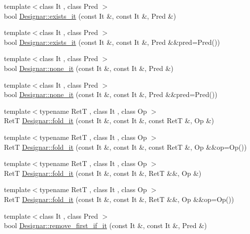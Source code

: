 \begin{DoxyCompactItemize}
{\footnotesize template$<$class It , class Pred $>$ }\\bool \hyperlink{namespace_designar_a65348ae854999f031477dcc97f6a4865}{Designar\+::exists\+\_\+it} (const It \&, const It \&, Pred \&)
\item 
{\footnotesize template$<$class It , class Pred $>$ }\\bool \hyperlink{namespace_designar_abac7b042ab21f3b7e1359cbec17b5e96}{Designar\+::exists\+\_\+it} (const It \&, const It \&, Pred \&\&pred=Pred())
\item 
{\footnotesize template$<$class It , class Pred $>$ }\\bool \hyperlink{namespace_designar_a1f6b851accb92e3589c88a4c75061588}{Designar\+::none\+\_\+it} (const It \&, const It \&, Pred \&)
\item 
{\footnotesize template$<$class It , class Pred $>$ }\\bool \hyperlink{namespace_designar_a1db95e69891b9a861d56297c556a645b}{Designar\+::none\+\_\+it} (const It \&, const It \&, Pred \&\&pred=Pred())
\item 
{\footnotesize template$<$typename RetT , class It , class Op $>$ }\\RetT \hyperlink{namespace_designar_a52cb61c301573a55b73956eed7d86ed9}{Designar\+::fold\+\_\+it} (const It \&, const It \&, const RetT \&, Op \&)
\item 
{\footnotesize template$<$typename RetT , class It , class Op $>$ }\\RetT \hyperlink{namespace_designar_a412ed1014bc60b2db6211871855ccba9}{Designar\+::fold\+\_\+it} (const It \&, const It \&, const RetT \&, Op \&\&op=Op())
\item 
{\footnotesize template$<$typename RetT , class It , class Op $>$ }\\RetT \hyperlink{namespace_designar_a034ad070a0aac24d53fd1c4612d2c58c}{Designar\+::fold\+\_\+it} (const It \&, const It \&, RetT \&\&, Op \&)
\item 
{\footnotesize template$<$typename RetT , class It , class Op $>$ }\\RetT \hyperlink{namespace_designar_a5d9fa528a06abdba905e1c46afc4ae22}{Designar\+::fold\+\_\+it} (const It \&, const It \&, RetT \&\&, Op \&\&op=Op())
\item 
{\footnotesize template$<$class It , class Pred $>$ }\\bool \hyperlink{namespace_designar_ab732236488ace0492a1cf5fd7ce9add9}{Designar\+::remove\+\_\+first\+\_\+if\+\_\+it} (const It \&, const It \&, Pred \&)
\item 

\end{DoxyCompactItemize}
